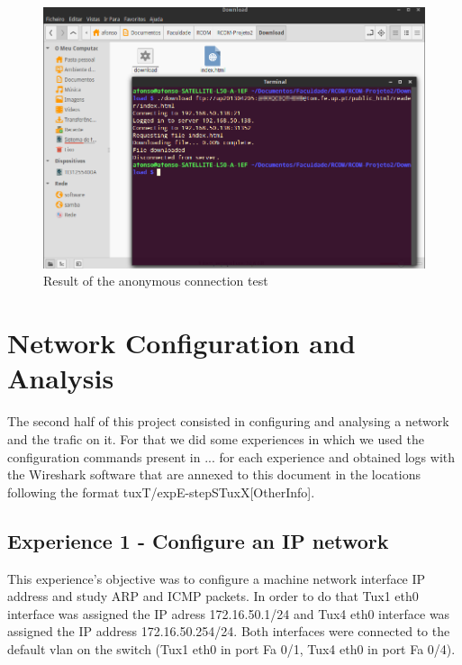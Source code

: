 \documentclass[11pt,a4paper,reqno]{article}
\numberwithin{equation}{section}
\begin{document}
\begin{figure}[p]
\centering
\includegraphics[scale=0.5]{anontest.png}
\caption{Result of the anonymous connection test}
\label{fig:anonconnection}
\end{figure}

\section{Network Configuration and Analysis}

The second half of this project consisted in configuring and analysing a network and the trafic on it. For that we did some experiences in which we
used the configuration commands present in ... for each experience and obtained logs with the Wireshark software that are annexed to this document
in the locations following the format tuxT/expE-stepSTuxX[OtherInfo].

\subsection{Experience 1 - Configure an IP network}

This experience’s objective was to configure a machine network interface IP address and study ARP and ICMP packets. In order to do that Tux1 eth0 interface was assigned the IP adress 172.16.50.1/24 and Tux4 eth0 interface was assigned the IP address 172.16.50.254/24. Both interfaces were connected to the default vlan on the switch (Tux1 eth0 in port Fa 0/1, Tux4 eth0 in port Fa 0/4).
\end{document}
